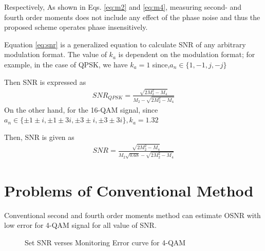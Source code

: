 \documentclass[12pt]{report}
\begin{document}
Respectively, As shown in Eqs. \ref{eq:m2} and \ref{eq:m4}, measuring second- and fourth order moments does not include any effect of the phase noise and thus the proposed scheme operates phase insensitively.

Equation \ref{eq:snr} is a generalized equation to calculate SNR of any arbitrary modulation format. The value of $k_a$ is dependent on the modulation format; for example, in the case of QPSK, we have $k_a=1$ since,$a_n\in\{1,-1,j,-j\}$

Then SNR is expressed as
\begin{align}
	SNR_{QPSK}=\frac{\sqrt{2M_2^2 -M_4}}{M_2-\sqrt{2M_2^2 -M_4}}
\end{align}
On the other hand, for the 16-QAM signal, since $a_n\in\{\pm 1 \pm i, \pm 1 \pm 3i, \pm 3 \pm i, \pm 3 \pm 3i\}, k_a=1.32$

Then, SNR is given as
\begin{align}\label{eq:snr16qam}
SNR=\frac{\sqrt{2M_2^2 -M_4}}{M_2\sqrt{0.68}-\sqrt{2M_2^2 -M_4}}
\end{align}

\section{Problems of Conventional Method}
Conventional second and fourth order moments method can estimate OSNR with low error for 4-QAM signal for all value of SNR.
\begin{figure}[htbp]
	\caption{Set SNR verses Monitoring Error curve for 4-QAM}
	\label{fig:4-qam-error}
\end{figure}
\end{document}
